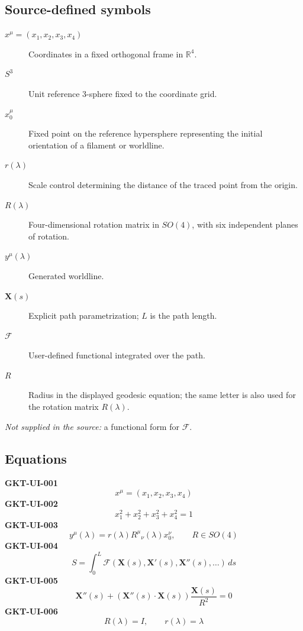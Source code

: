 \documentclass[10pt]{article}
\begin{document}
\subsection*{Source-defined symbols}
\begin{description}
\item[$x^\mu=(x_1,x_2,x_3,x_4)$] Coordinates in a fixed orthogonal frame in $\mathbb R^4$.
\item[$S^3$] Unit reference 3-sphere fixed to the coordinate grid.
\item[$x_0^\mu$] Fixed point on the reference hypersphere representing the initial orientation of a filament or worldline.
\item[$r(\lambda)$] Scale control determining the distance of the traced point from the origin.
\item[$R(\lambda)$] Four-dimensional rotation matrix in $SO(4)$, with six independent planes of rotation.
\item[$y^\mu(\lambda)$] Generated worldline.
\item[$\mathbf X(s)$] Explicit path parametrization; $L$ is the path length.
\item[$\mathcal F$] User-defined functional integrated over the path.
\item[$R$] Radius in the displayed geodesic equation; the same letter is also used for the rotation matrix $R(\lambda)$.
\end{description}
\textit{Not supplied in the source:} a functional form for $\mathcal F$.

\subsection*{Equations}
\textbf{GKT-UI-001}
\begin{equation*}
x^\mu=(x_1,x_2,x_3,x_4)
\end{equation*}
\textbf{GKT-UI-002}
\begin{equation*}
x_1^2+x_2^2+x_3^2+x_4^2=1
\end{equation*}
\textbf{GKT-UI-003}
\begin{equation*}
y^\mu(\lambda)=r(\lambda)R^\mu{}_{\nu}(\lambda)x_0^\nu,\qquad R\in SO(4)
\end{equation*}
\textbf{GKT-UI-004}
\begin{equation*}
S=\int_0^L\mathcal F\!\left(\mathbf X(s),\mathbf X'(s),\mathbf X''(s),\ldots\right)\,ds
\end{equation*}
\textbf{GKT-UI-005}
\begin{equation*}
\mathbf X''(s)+\left(\mathbf X''(s)\cdot\mathbf X(s)\right)\frac{\mathbf X(s)}{R^2}=0
\end{equation*}
\textbf{GKT-UI-006}
\begin{equation*}
R(\lambda)=I,\qquad r(\lambda)=\lambda
\end{equation*}
\end{document}
